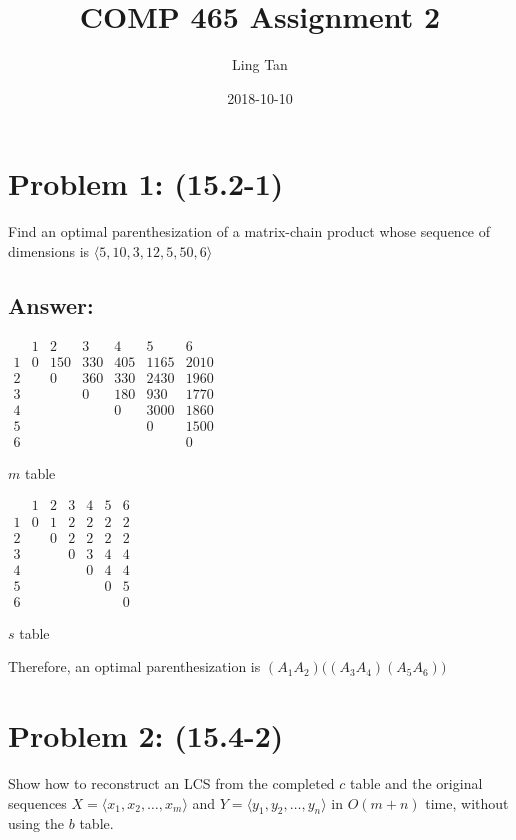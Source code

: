 \documentclass[a4paper]{article}
\title{COMP 465 Assignment 2}
\date{2018-10-10}
\author{Ling Tan}
\begin{document}
\maketitle

\section*{Problem 1: (15.2-1)} Find an optimal parenthesization of a matrix-chain product whose sequence of dimensions is $\langle5, 10, 3, 12, 5, 50, 6\rangle$
\subsection*{Answer:}
\begin{table}[H]
    \centering
    $
    \begin{array}{c|cccccc}
     & 1 & 2 & 3 & 4 & 5 & 6\\
    \hline
     1 & 0 & 150 & 330 & 405 & 1165 & 2010\\
     2 &   & 0 & 360 & 330 & 2430 & 1960\\
     3 &   &   & 0 & 180 & 930 & 1770\\
     4 &   &   &   & 0 & 3000 & 1860\\
     5 &   &   &   &   & 0 & 1500\\
     6 &   &   &   &   &   & 0
    \end{array}
    $
    \caption{$m$ table}
    \label{tab:my_label}
\end{table}
\begin{table}[H]
    \centering
    $
    \begin{array}{c|cccccc}
     & 1 & 2 & 3 & 4 & 5 & 6\\
    \hline
     1 & 0 & 1 & 2 & 2 & 2 & 2\\
     2 &   & 0 & 2 & 2 & 2 & 2\\
     3 &   &   & 0 & 3 & 4 & 4\\
     4 &   &   &   & 0 & 4 & 4\\
     5 &   &   &   &   & 0 & 5\\
     6 &   &   &   &   &   & 0
    \end{array}
    $
    \caption{$s$ table}
    \label{tab:my_label}
\end{table}
Therefore, an optimal parenthesization is
$(A_1A_2)\big((A_3A_4)(A_5A_6)\big)$


\section*{Problem 2: (15.4-2) } Show how to reconstruct an LCS from the completed $c$ table and the original sequences $X = \langle x_1, x_2,\dots, x_m\rangle$ and $Y = \langle y_1, y_2, \dots, y_n\rangle$ in $O(m +n)$ time, without using the $b$ table.
\end{document}

